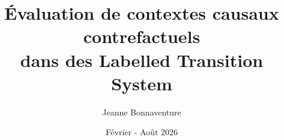 \usepackage{setspace}
\onehalfspacing
\usepackage[T1]{fontenc}
\usepackage{graphicx}
\usepackage{dsfont}
\usepackage{amsmath}
\usepackage[all]{xy}
\usepackage{appendix}
\usepackage{stmaryrd} 
\DeclareMathOperator*{\argmin}{argmin}
\DeclareMathOperator*{\argmax}{argmax}
\usepackage{geometry}
\geometry{hmargin=2.5cm,vmargin=2.5cm, top = 2cm, bottom= 2cm}
\usepackage{amssymb}
\usepackage{caption}
\usepackage{subcaption}
\usepackage{pifont}
\newcommand{\cmark}{\ding{51}}%
\newcommand{\xmark}{\ding{55}}%
\usepackage{xcolor}
\usepackage{csquotes}
\usepackage[french]{babel}
\usepackage{booktabs}
\usepackage{listings}
\usepackage{minipage-marginpar}
\usepackage{hyperref}
\usepackage{mathtools}
\usepackage[dvipsnames]{xcolor}
\usepackage{amsthm}

\newtheorem{definition}{Définition}[section]

\usepackage{enumitem}
\newcommand*{\longDefiningEquals}{\stackrel{\text{def}}{=\joinrel=}}
\title{Évaluation de contextes causaux contrefactuels \\ dans des Labelled Transition System}
\author{Jeanne Bonnaventure}
\date{Février - Août 2026}
\usepackage{subfiles}
\usepackage[style=authoryear, backend=biber, url=false]{biblatex}





